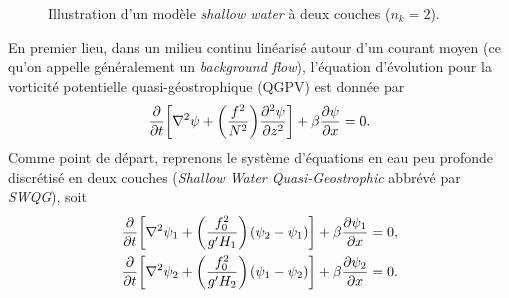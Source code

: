 \documentclass[10pt]{article}
\numberwithin{equation}{section}
\newcommand{\pt}{\hspace{1pt}} %
\begin{document}
\begin{figure}
\begin{center}
\vspace{-\baselineskip}
\end{center}
\caption{\label{org4ff501d}Illustration d'un modèle \textit{shallow water} à deux couches (\(n_k = 2\)).}
\end{figure}

En premier lieu, dans un milieu continu linéarisé autour d'un courant moyen (ce qu'on appelle généralement un \emph{background flow}), l'équation d'évolution pour la vorticité potentielle quasi-géostrophique (QGPV) est donnée par
\begin{equation}
\label{eq:org4918c9d}
   \pdv{}{t} \qty[\laplacian\psi + \qty(\frac{f^2}{N^2})\pdv[2]{\psi}{z}] + \beta \pdv{\psi}{x} = 0.
\end{equation}
Comme point de départ, reprenons le système d'équations en eau peu profonde discrétisé en deux couches (\emph{Shallow Water Quasi-Geostrophic} abbrévé par \emph{SWQG}), soit
\begin{subequations}
\label{eq:orgf52f8fd}
\begin{align}
   &\pdv{}{t} \qty[\laplacian\psi_1 + \qty(\frac{f_0^2}{g'H_1}) \pt(\psi_2 - \psi_1)] + \beta \pdv{\psi_1}{x} = 0,\\
   &\pdv{}{t} \qty[\laplacian\psi_2 + \qty(\frac{f_0^2}{g'H_2}) \pt(\psi_1 - \psi_2)] + \beta \pdv{\psi_2}{x} = 0.
\end{align}
\end{subequations}
\end{document}
